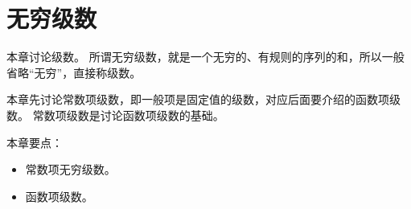 \chapter{无穷级数}

本章讨论级数。
所谓无穷级数，就是一个无穷的、有规则的序列的和，所以一般省略“无穷”，直接称级数。

本章先讨论常数项级数，即一般项是固定值的级数，对应后面要介绍的函数项级数。
常数项级数是讨论函数项级数的基础。

本章要点：
\begin{itemize}
    \item 常数项无穷级数。
    \item 函数项级数。
\end{itemize}

~

\newpage


\newpage


\newpage


\newpage


\newpage


\newpage


\newpage





